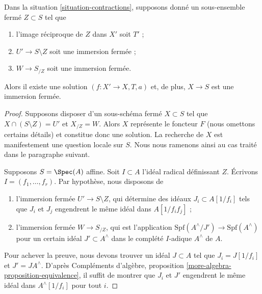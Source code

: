 \begin{lemma}
\label{lemma-closed-immersion}
Dans la situation \ref{situation-contractions}, supposons donné un
sous-ensemble fermé $Z \subset S$ tel que
\begin{enumerate}
\item l'image réciproque de $Z$ dans $X'$ soit $T'$ ;
\item $U' \to S \setminus Z$ soit une immersion fermée ;
\item $W \to S_{/Z}$ soit une immersion fermée.
\end{enumerate}
Alors il existe une solution $(f : X' \to X, T, a)$ et, de plus,
$X \to S$ est une immersion fermée.
\end{lemma}

\begin{proof}
Supposons disposer d'un sous-schéma fermé $X \subset S$ tel que
$X \cap (S \setminus Z) = U'$ et $X_{/Z} = W$. Alors $X$ représente le
foncteur $F$ (nous omettons certains détails) et constitue donc une solution.
La recherche de $X$ est manifestement une question locale sur $S$. Nous nous
ramenons ainsi au cas traité dans le paragraphe suivant.

\medskip\noindent
Supposons $S = \Spec(A)$ affine. Soit $I \subset A$ l'idéal radical définissant
$Z$. Écrivons $I = (f_1, \ldots, f_r)$. Par hypothèse, nous disposons de
\begin{enumerate}
\item l'immersion fermée $U' \to S \setminus Z$, qui détermine des idéaux
$J_i \subset A[1/f_i]$ tels que $J_i$ et $J_j$ engendrent le même idéal dans
$A[1/f_if_j]$ ;
\item l'immersion fermée $W \to S_{/Z}$, qui est l'application
$\text{Spf}(A^\wedge/J') \to \text{Spf}(A^\wedge)$
pour un certain idéal $J' \subset A^\wedge$ dans le complété $I$-adique
$A^\wedge$ de $A$.
\end{enumerate}
Pour achever la preuve, nous devons trouver un idéal $J \subset A$ tel que
$J_i = J[1/f_i]$ et $J' = JA^\wedge$. D'après Compléments d'algèbre,
proposition \ref{more-algebra-proposition-equivalence}, il suffit de montrer
que $J_i$ et $J'$ engendrent le même idéal dans $A^\wedge[1/f_i]$ pour tout
$i$.


\end{proof}

